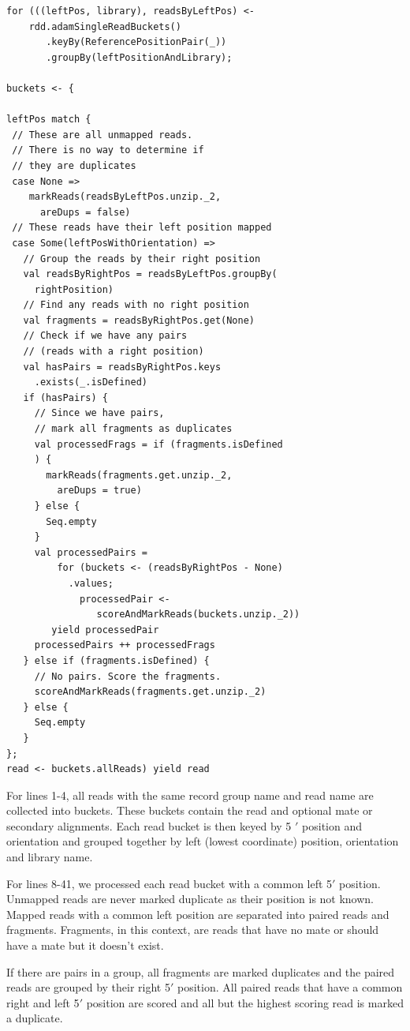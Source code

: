 \documentclass[10pt,twocolumn]{article}
\theoremstyle{plain}
\begin{document}
\begin{lstlisting}
for (((leftPos, library), readsByLeftPos) <- 
    rdd.adamSingleReadBuckets()
       .keyBy(ReferencePositionPair(_))
       .groupBy(leftPositionAndLibrary);

buckets <- {

leftPos match {
 // These are all unmapped reads. 
 // There is no way to determine if
 // they are duplicates
 case None =>
    markReads(readsByLeftPos.unzip._2,
      areDups = false)
 // These reads have their left position mapped
 case Some(leftPosWithOrientation) =>
   // Group the reads by their right position
   val readsByRightPos = readsByLeftPos.groupBy(
     rightPosition)
   // Find any reads with no right position
   val fragments = readsByRightPos.get(None)
   // Check if we have any pairs
   // (reads with a right position)
   val hasPairs = readsByRightPos.keys
     .exists(_.isDefined)
   if (hasPairs) {
     // Since we have pairs,
     // mark all fragments as duplicates
     val processedFrags = if (fragments.isDefined
     ) {
       markReads(fragments.get.unzip._2,
         areDups = true)
     } else {
       Seq.empty
     }
     val processedPairs = 
         for (buckets <- (readsByRightPos - None)
           .values;
             processedPair <- 
                scoreAndMarkReads(buckets.unzip._2)) 
        yield processedPair
     processedPairs ++ processedFrags
   } else if (fragments.isDefined) {
     // No pairs. Score the fragments.
     scoreAndMarkReads(fragments.get.unzip._2)
   } else {
     Seq.empty
   }
};
read <- buckets.allReads) yield read
\end{lstlisting}

For lines 1-4, all reads with the same record group name and read name are collected 
into buckets. These buckets contain the read and optional mate or secondary alignments.
Each read bucket is then keyed by 5 $'$ position and orientation and grouped together by
left (lowest coordinate) position, orientation and library name.

For lines 8-41, we processed each read bucket with a common left 5$'$ position. Unmapped
reads are never marked duplicate as their position is not known. Mapped reads with a common
left position are separated into paired reads and fragments. Fragments, in this context,
are reads that have no mate or should have a mate but it doesn't exist.

If there are pairs in a group, all fragments are marked duplicates and the paired reads are grouped
by their right 5$'$ position. All paired reads that have a common right and left 5$'$
position are scored and all but the highest scoring read is marked a duplicate.
\end{document}

